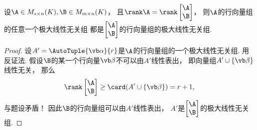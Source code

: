 \begin{example}\label{example:向量空间.等秩矩阵的行向量组的等价性}
设\(\A \in M_{s \times n}(K),
\B \in M_{m \times n}(K)\)，
且\(\rank\A
= \rank\begin{bmatrix}
	\A \\ \B
\end{bmatrix}\)，
则\(\A\)的行向量组的任意一个极大线性无关组
都是\(\begin{bmatrix}
	\A \\ \B
\end{bmatrix}\)的行向量组的极大线性无关组.
\begin{proof}
设\(A' = \AutoTuple{\vb\alpha}{r}\)是\(\A\)的行向量组的一个极大线性无关组.
用反证法.
假设\(\B\)的某一个行向量\(\vb\beta\)不可以由\(A'\)线性表出，
即向量组\(A' \cup \{\vb\beta\}\)线性无关，
那么\begin{equation*}
	\rank\begin{bmatrix}
		\A \\ \B
	\end{bmatrix}
	\geq \card(A' \cup \{\vb\beta\})
	= r + 1,
\end{equation*}
与题设矛盾！
因此\(\B\)的行向量组可以由\(A'\)线性表出，
\(A'\)是\(\begin{bmatrix}
	\A \\ \B
\end{bmatrix}\)的极大线性无关组.
\end{proof}
\end{example}

